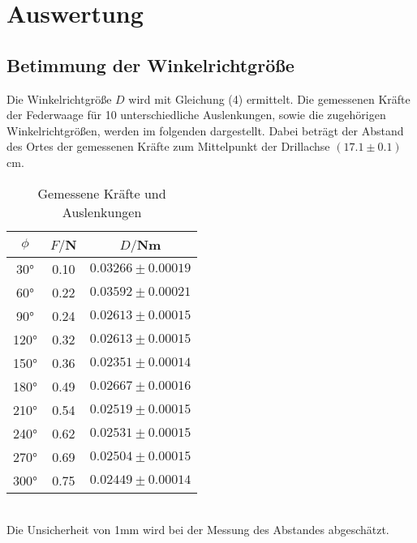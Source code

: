 \section{Auswertung}
\label{sec:Auswertung}
\subsection{Betimmung der Winkelrichtgröße}
Die Winkelrichtgröße $D$ wird mit Gleichung (4) ermittelt.
Die gemessenen Kräfte der Federwaage für 10 unterschiedliche Auslenkungen, sowie
die zugehörigen Winkelrichtgrößen, werden im folgenden dargestellt. Dabei beträgt
der Abstand des Ortes der gemessenen Kräfte zum Mittelpunkt der Drillachse
$(17.1 \pm 0.1)$cm.
\begin{table}
  \centering
  \caption{Gemessene Kräfte und Auslenkungen}
  \label{tab:Parameter}
  \begin{tabular}{c c c}
    \toprule
    $\phi$ & $F/$N & $D/$Nm \\
    \bottomrule
     30° & 0.10  & $0.03266 \pm 0.00019$ \\
     60° & 0.22  & $0.03592 \pm 0.00021$ \\
     90° & 0.24  & $0.02613 \pm 0.00015$ \\
    120° & 0.32  & $0.02613 \pm 0.00015$ \\
    150° & 0.36  & $0.02351 \pm 0.00014$ \\
    180° & 0.49  & $0.02667 \pm 0.00016$ \\
    210° & 0.54  & $0.02519 \pm 0.00015$ \\
    240° & 0.62  & $0.02531 \pm 0.00015$ \\
    270° & 0.69  & $0.02504 \pm 0.00015$ \\
    300° & 0.75  & $0.02449 \pm 0.00014$ \\
    \bottomrule
  \end{tabular}
\end{table} \\

Die Unsicherheit von 1mm wird bei der Messung des Abstandes
abgeschätzt.

